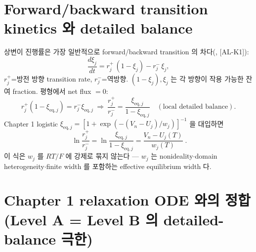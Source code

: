 \documentclass[11pt,a4paper]{article}
\newcommand{\eq}{\mathrm{eq}}
\newcommand{\AL}[1]{\textsf{[AL-#1]}}
\begin{document}
\section{Forward/backward transition kinetics 와 detailed balance}\label{sec:ch3_db}
상변이 진행률은 가장 일반적으로 forward/backward transition 의 차다(\cite{eyring1935,degrootmazur1962}, \AL{K1}):
\begin{equation}
\frac{d\xi_j}{dt}=r_j^+\,(1-\xi_j)-r_j^-\,\xi_j,
\label{eq:ch3_fb}
\end{equation}
$r_j^+$=방전 방향 transition rate, $r_j^-$=역방향. $(1-\xi_j),\xi_j$ 는 각 방향이 작용 가능한 잔여
fraction. 평형에서 net flux $=0$:
\begin{equation}
r_j^+(1-\xi_{\eq,j})=r_j^-\xi_{\eq,j}
\ \Longrightarrow\
\frac{r_j^+}{r_j^-}=\frac{\xi_{\eq,j}}{1-\xi_{\eq,j}}\quad(\text{local detailed balance}).
\label{eq:ch3_db}
\end{equation}
Chapter 1 logistic $\xi_{\eq,j}=[1+\exp(-(V_n-U_j)/w_j)]^{-1}$ 을 대입하면
\begin{equation}
\boxed{\;\ln\frac{r_j^+}{r_j^-}=\ln\frac{\xi_{\eq,j}}{1-\xi_{\eq,j}}=\frac{V_n-U_j(T)}{w_j(T)}\;.}
\label{eq:ch3_db_width}
\end{equation}
이 식은 $w_j$ 를 $RT/F$ 에 강제로 묶지 않는다 — $w_j$ 는 nonideality$\cdot$domain heterogeneity$\cdot$finite
width 를 포함하는 effective equilibrium width 다.

\section{Chapter 1 relaxation ODE 와의 정합 (Level A = Level B 의 detailed-balance 극한)}\label{sec:ch3_consistency}
\end{document}
